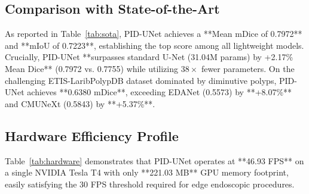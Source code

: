 \documentclass[conference]{IEEEtran}
\begin{document}
\subsection{Comparison with State-of-the-Art}
As reported in Table~\ref{tab:sota}, PID-UNet achieves a **Mean mDice of 0.7972** and **mIoU of 0.7223**, establishing the top score among all lightweight models.
Crucially, PID-UNet **surpasses standard U-Net (31.04M params) by +2.17\% Mean Dice** (0.7972 vs. 0.7755) while utilizing $38\times$ fewer parameters.
On the challenging ETIS-LaribPolypDB dataset dominated by diminutive polyps, PID-UNet achieves **0.6380 mDice**, exceeding EDANet (0.5573) by **+8.07\%** and CMUNeXt (0.5843) by **+5.37\%**.

\begin{table}[t]
\centering
\caption{Deployment Efficiency on NVIDIA Tesla T4 GPU ($352\times352$)}
\label{tab:hardware}
\end{table}

\subsection{Hardware Efficiency Profile}
Table~\ref{tab:hardware} demonstrates that PID-UNet operates at **46.93 FPS** on a single NVIDIA Tesla T4 with only **221.03 MB** GPU memory footprint, easily satisfying the 30 FPS threshold required for edge endoscopic procedures.
\end{document}
